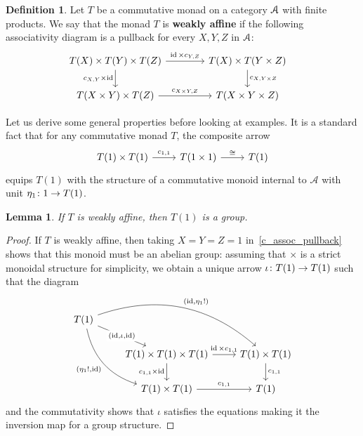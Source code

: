 \documentclass[a4paper,UKenglish,numberwithinsect,cleveref, autoref, thm-restate]{lipics-v2021}
\theoremstyle{plain} %
\newtheorem{mylemma}[mytheorem]{Lemma}
\theoremstyle{definition} %
\newtheorem{mydefinition}[mytheorem]{Definition}
\begin{document}
\begin{mydefinition}
	Let $T$ be a commutative monad on a category $\mA$ with finite products. 
	We say that the monad $T$ is \textbf{weakly affine} if the
	following associativity diagram is a pullback for every $X,Y,Z$ in $\mA$:
	\begin{equation}
		\label{c_assoc_pullback}
		\hspace{-9pt}	%
		\begin{tikzcd}[column sep=3.3pc]
			T(X) \times T(Y) \times T(Z) \ar{r}{\id \times c_{Y,Z}} \ar[swap]{d}{c_{X,Y} \times \id}	& T(X) \times T(Y \times Z) \ar{d}{c_{X,Y \times Z}}	\\
			T(X \times Y) \times T(Z) \ar{r}{c_{X\times Y,Z}}						& T(X \times Y \times Z)
		\end{tikzcd}
	\end{equation}
\end{mydefinition}

Let us derive some general properties before looking at examples.
It is a standard fact that for any commutative monad $T$, the composite arrow
\[
	\begin{tikzcd}
		T(1) \times T(1) \ar{r}{c_{1,1}}	& T(1 \times 1) \ar{r}{\cong}	& T(1)		
	\end{tikzcd}
\]
equips $T(1)$ with the structure of a commutative monoid internal to $\mathcal{A}$ with unit $\freccia{1}{\eta_1}{T(1)}$.

\begin{mylemma}\label{lem_T1_group}
	\label{lem:T1_group}
	If $T$ is weakly affine, then $T(1)$ is a group.
\end{mylemma}


\begin{proof}
	If $T$ is weakly affine, then taking $X = Y = Z = 1$ in~\eqref{c_assoc_pullback} shows that this monoid must be an abelian group:
	assuming that $\times$ is a strict monoidal structure for simplicity, we obtain a unique arrow $\freccia{T(1)}{\iota}{T(1)}$ such that the diagram
	\[
		\begin{tikzcd}
			T(1) \ar{dr}[description]{(\id,\iota,\id)} \ar[bend left]{drr}{(\id,\eta_1 !)} \ar[bend right,swap]{ddr}{(\eta_1 !,\id)} \\
			&	T(1) \times T(1) \times T(1) \ar{r}{\id \times c_{1,1}} \ar[swap]{d}{c_{1,1} \times \id}	& T(1) \times T(1) \ar{d}{c_{1,1}}	\\
			&	T(1) \times T(1) \ar{r}{c_{1,1}}								& T(1)
		\end{tikzcd}
	\]
	and the commutativity shows that $\iota$ satisfies the equations making it the inversion map for a group structure.
\end{proof}
\end{document}
